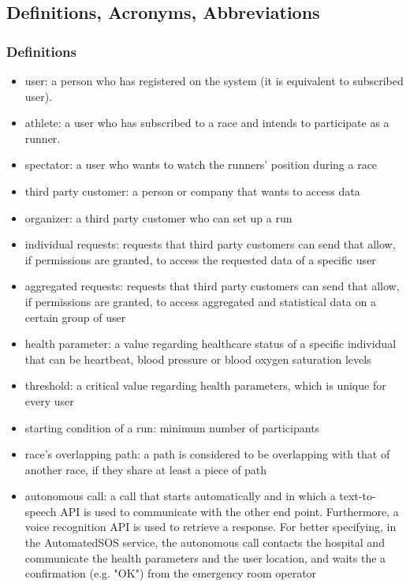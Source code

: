 \subsection{Definitions, Acronyms, Abbreviations}
\subsubsection{Definitions}
\begin{itemize}
\item user: a person who has registered on the system (it is equivalent to subscribed user).
\item athlete: a user who has subscribed to a race and intends to participate as a runner.
\item spectator: a user who wants to watch the runners' position during a race   
\item third party customer: a person or company that wants to access data
\item organizer: a third party customer who can set up a run
\item individual requests: requests that third party customers can send that allow, if permissions are granted, to access the requested data of a specific user
\item aggregated requests: requests that third party customers can send that allow, if permissions are granted, to access aggregated and statistical data on a certain group of user
\item health parameter: a value regarding healthcare status of a specific individual that can be heartbeat, blood pressure or blood oxygen saturation levels 
\item threshold: a critical value regarding health parameters, which is unique for every user
\item starting condition of a run: minimum number of participants
\item race's overlapping path: a path is considered to be overlapping with that of another race, if they share at least a piece of path
\item autonomous call: a call that starts automatically and in which a text-to-speech API is used to communicate with the other end point. 
Furthermore, a voice recognition API is used to retrieve a response. 
For better specifying, in the AutomatedSOS service, the autonomous call contacts the hospital and communicate the health parameters and the user location, and waits the a confirmation (e.g. "OK") from the emergency room operator
\end{itemize}

